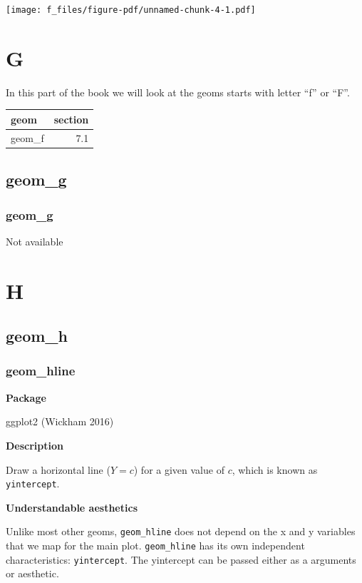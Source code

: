 \documentclass[
  letterpaper,
  DIV=11,
  numbers=noendperiod]{scrreprt}
\begin{document}
\texttt{[image: f\_files/figure-pdf/unnamed-chunk-4-1.pdf]}

\part{G}

In this part of the book we will look at the geoms starts with letter
``f'' or ``F''.

\begin{longtable}[]{@{}lr@{}}
\toprule\noalign{}
geom & section \\
\midrule\noalign{}
\endhead
\bottomrule\noalign{}
\endlastfoot
geom\_f & 7.1 \\
\end{longtable}

\chapter{geom\_g}\label{sec-g}

\section{geom\_g}\label{geom_g}

Not available

\part{H}

\chapter{geom\_h}\label{sec-h}

\section{geom\_hline}\label{hline}

\textbf{Package}

ggplot2 (Wickham 2016)

\textbf{Description}

Draw a horizontal line (\(Y=c\)) for a given value of \(c\), which is
known as \texttt{yintercept}.

\textbf{Understandable aesthetics}

Unlike most other geoms, \texttt{geom\_hline} does not depend on the x
and y variables that we map for the main plot. \texttt{geom\_hline} has
its own independent characteristics: \texttt{yintercept}. The yintercept
can be passed either as a arguments or aesthetic.
\end{document}
